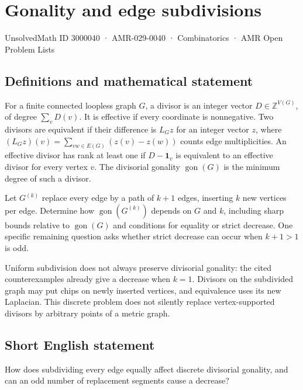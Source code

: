 \documentclass[11pt,a4paper]{article}
\begin{document}
\section*{Gonality and edge subdivisions}\label{3000040}
{\small UnsolvedMath ID 3000040 · AMR-029-0040 · Combinatorics · AMR Open Problem Lists}
\subsection{Definitions and mathematical statement}
For a finite connected loopless graph $G$, a divisor is an integer
vector $D\in\mathbb Z^{V(G)}$, of degree $\sum_vD(v)$. It is effective
if every coordinate is nonnegative. Two divisors are equivalent if
their difference is $L_Gz$ for an integer vector $z$, where
$(L_Gz)(v)=\sum_{vw\in E(G)}(z(v)-z(w))$ counts edge multiplicities.
An effective divisor has rank at least one if $D-\mathbf1_v$ is
equivalent to an effective divisor for every vertex $v$.
The divisorial gonality $\operatorname{gon}(G)$ is the minimum degree
of such a divisor.

Let $G^{(k)}$ replace every edge by a path of $k+1$ edges, inserting
$k$ new vertices per edge. Determine how $\operatorname{gon}(G^{(k)})$
depends on $G$ and $k$, including sharp bounds relative to
$\operatorname{gon}(G)$ and conditions for equality or strict decrease.
One specific remaining question asks whether strict decrease can
occur when $k+1>1$ is odd.

Uniform subdivision does not always preserve divisorial gonality:
the cited counterexamples already give a decrease when $k=1$.
Divisors on the subdivided graph may put chips on newly inserted
vertices, and equivalence uses its new Laplacian. This discrete problem
does not silently replace vertex-supported divisors by arbitrary
points of a metric graph.
\subsection{Short English statement}
How does subdividing every edge equally affect discrete divisorial
gonality, and can an odd number of replacement segments cause a decrease?
\end{document}
